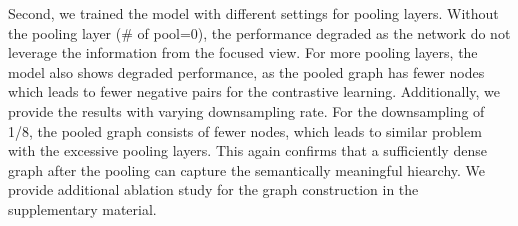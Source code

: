 \documentclass[letterpaper]{article} %
\begin{document}
Second, we trained the model with different settings for pooling layers. Without the pooling layer (\# of pool=0), the performance degraded as the network do not leverage the information from the focused view. For more pooling layers, the model also shows degraded performance, as the pooled graph has fewer nodes which leads to fewer negative pairs for the contrastive learning. Additionally, we provide the results with varying downsampling rate. For the downsampling of 1/8, the pooled graph consists of fewer nodes, which leads to similar problem with the excessive pooling layers.
This again confirms that a sufficiently dense graph after the pooling can capture the semantically meaningful hiearchy.
We provide additional ablation study for the graph construction in the supplementary material.


\begin{table}[!t]
\begin{center}
\end{center}
\caption{Quantitative results of ablation studies. Our setting shows the best performance in both of FID and KID$\times$100.}
\label{table:ablation}
\end{table}
\end{document}
